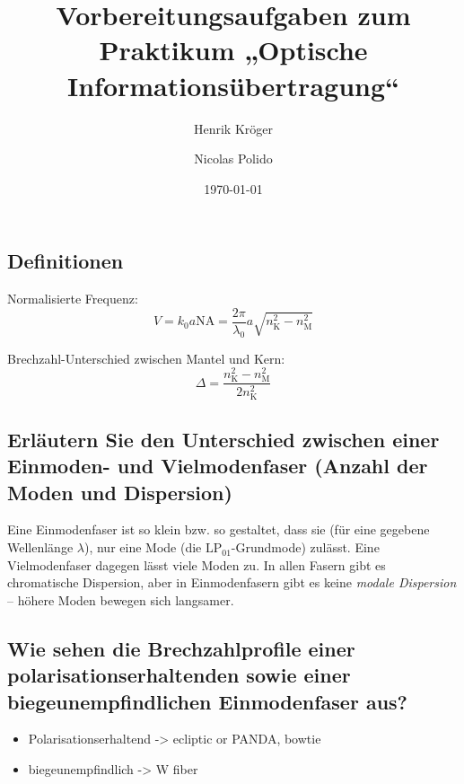 \documentclass[a4paper]{scrartcl}
\title{Vorbereitungsaufgaben zum Praktikum „Optische Informationsübertragung“}
\author{Henrik Kröger \and Nicolas Polido}
\date{\today}
\begin{document}
\maketitle

\subsection*{Definitionen}

Normalisierte Frequenz:
\begin{equation}
    V = k_0 a \text{NA} = \frac{2\pi}{\lambda_0} a \sqrt{n_\text{K}^2 - n_\text{M}^2}
\end{equation}

Brechzahl-Unterschied zwischen Mantel und Kern:
\begin{equation}
    \Delta = \frac{n_\text{K}^2 - n_\text{M}^2}{2n_\text{K}^2}
\end{equation}


\subsection*{Erläutern Sie den Unterschied zwischen einer Einmoden- und Vielmodenfaser
(Anzahl der Moden und Dispersion)}

Eine Einmodenfaser ist so klein bzw. so gestaltet, dass sie
(für eine gegebene Wellenlänge $\lambda$),
nur eine Mode (die $\text{LP}_{01}$-Grundmode) zulässt.
Eine Vielmodenfaser dagegen lässt viele Moden zu.
In allen Fasern gibt es chromatische Dispersion, aber in Einmodenfasern gibt es
keine \emph{modale Dispersion} – höhere Moden bewegen sich langsamer.


\subsection*{Wie sehen die Brechzahlprofile einer polarisationserhaltenden sowie einer
biegeunempfindlichen Einmodenfaser aus?}

\begin{itemize}
    \item Polarisationserhaltend -> ecliptic or PANDA, bowtie
    \item biegeunempfindlich -> W fiber
\end{itemize}
\end{document}
